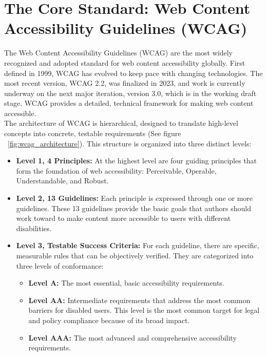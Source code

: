 \documentclass{scrbook}
\begin{document}
\chapter{The Core Standard: Web Content Accessibility Guidelines (WCAG)}

The Web Content Accessibility Guidelines (WCAG) are the most widely recognized and adopted standard for web content accessibility globally. First defined in 1999, WCAG has evolved to keep pace with changing technologies. The most recent version, WCAG 2.2, was finalized in 2023, and work is currently underway on the next major iteration, version 3.0, which is in the working draft stage. WCAG provides a detailed, technical framework for making web content accessible. \\

The architecture of WCAG is hierarchical, designed to translate high-level concepts into concrete, testable requirements (See figure ~\ref{fig:wcag_architecture}). This structure is organized into three distinct levels:

\begin{itemize}
    \item \textbf{Level 1, 4 Principles:} At the highest level are four guiding principles that form the foundation of web accessibility: Perceivable, Operable, Understandable, and Robust.
    \item \textbf{Level 2, 13 Guidelines:} Each principle is expressed through one or more guidelines. These 13 guidelines provide the basic goals that authors should work toward to make content more accessible to users with different disabilities.
    \item \textbf{Level 3, Testable Success Criteria:} For each guideline, there are specific, measurable rules that can be objectively verified. They are categorized into three levels of conformance:
    \begin{itemize}
        \item \textbf{Level A:} The most essential, basic accessibility requirements.
        \item \textbf{Level AA:} Intermediate requirements that address the most common barriers for disabled users. This level is the most common target for legal and policy compliance because of its broad impact.
        \item \textbf{Level AAA:} The most advanced and comprehensive accessibility requirements.
    \end{itemize}
\end{itemize}
\end{document}
